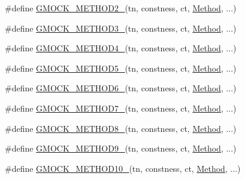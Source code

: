 \begin{DoxyCompactItemize}
\item 
\#define \mbox{\hyperlink{gmock-generated-function-mockers_8h_a885295ca6bebb15efb3fc786218c5d47}{G\+M\+O\+C\+K\+\_\+\+M\+E\+T\+H\+O\+D2\+\_\+}}(tn,  constness,  ct,  \mbox{\hyperlink{gmock-spec-builders__test_8cc_a95606368148f3e5aab5db46c32466afd}{Method}}, ...)
\item 
\#define \mbox{\hyperlink{gmock-generated-function-mockers_8h_af7c77ba511c631de02bb8c45a6ed3045}{G\+M\+O\+C\+K\+\_\+\+M\+E\+T\+H\+O\+D3\+\_\+}}(tn,  constness,  ct,  \mbox{\hyperlink{gmock-spec-builders__test_8cc_a95606368148f3e5aab5db46c32466afd}{Method}}, ...)
\item 
\#define \mbox{\hyperlink{gmock-generated-function-mockers_8h_ab6430f2cfad9de4aca5258ea559294bb}{G\+M\+O\+C\+K\+\_\+\+M\+E\+T\+H\+O\+D4\+\_\+}}(tn,  constness,  ct,  \mbox{\hyperlink{gmock-spec-builders__test_8cc_a95606368148f3e5aab5db46c32466afd}{Method}}, ...)
\item 
\#define \mbox{\hyperlink{gmock-generated-function-mockers_8h_a9e3ecd392499ab19a4a6d3adcabf56f6}{G\+M\+O\+C\+K\+\_\+\+M\+E\+T\+H\+O\+D5\+\_\+}}(tn,  constness,  ct,  \mbox{\hyperlink{gmock-spec-builders__test_8cc_a95606368148f3e5aab5db46c32466afd}{Method}}, ...)
\item 
\#define \mbox{\hyperlink{gmock-generated-function-mockers_8h_ad0ca7f6973a076d0af4c953f8ed91842}{G\+M\+O\+C\+K\+\_\+\+M\+E\+T\+H\+O\+D6\+\_\+}}(tn,  constness,  ct,  \mbox{\hyperlink{gmock-spec-builders__test_8cc_a95606368148f3e5aab5db46c32466afd}{Method}}, ...)
\item 
\#define \mbox{\hyperlink{gmock-generated-function-mockers_8h_ab98a8399ba62b53b375c2807f4d39d2f}{G\+M\+O\+C\+K\+\_\+\+M\+E\+T\+H\+O\+D7\+\_\+}}(tn,  constness,  ct,  \mbox{\hyperlink{gmock-spec-builders__test_8cc_a95606368148f3e5aab5db46c32466afd}{Method}}, ...)
\item 
\#define \mbox{\hyperlink{gmock-generated-function-mockers_8h_aa84a36427c44505207b7cad5dec7ad67}{G\+M\+O\+C\+K\+\_\+\+M\+E\+T\+H\+O\+D8\+\_\+}}(tn,  constness,  ct,  \mbox{\hyperlink{gmock-spec-builders__test_8cc_a95606368148f3e5aab5db46c32466afd}{Method}}, ...)
\item 
\#define \mbox{\hyperlink{gmock-generated-function-mockers_8h_aa820171a19cc587c247dbe05cbffc55f}{G\+M\+O\+C\+K\+\_\+\+M\+E\+T\+H\+O\+D9\+\_\+}}(tn,  constness,  ct,  \mbox{\hyperlink{gmock-spec-builders__test_8cc_a95606368148f3e5aab5db46c32466afd}{Method}}, ...)
\item 
\#define \mbox{\hyperlink{gmock-generated-function-mockers_8h_a81a48223a8771de36ef92ac6d56f6e81}{G\+M\+O\+C\+K\+\_\+\+M\+E\+T\+H\+O\+D10\+\_\+}}(tn,  constness,  ct,  \mbox{\hyperlink{gmock-spec-builders__test_8cc_a95606368148f3e5aab5db46c32466afd}{Method}}, ...)

\end{DoxyCompactItemize}
